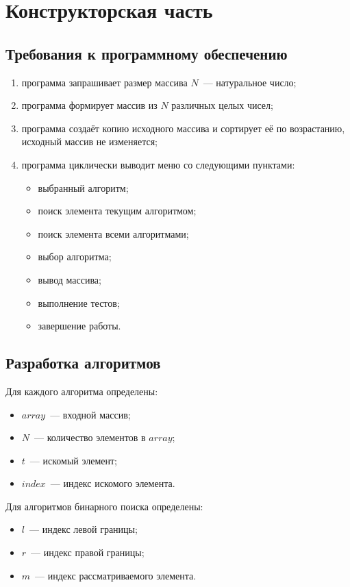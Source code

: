 \chapter{Конструкторская часть}

\section{Требования к программному обеспечению}

\begin{enumerate}
  \item программа запрашивает размер массива $N$~--- натуральное число;
  \item программа формирует массив из $N$ различных целых чисел;
  \item программа создаёт копию исходного массива и сортирует её
    по возрастанию, исходный массив не изменяется;
  \item программа циклически выводит меню со следующими пунктами:
    \begin{itemize}
      \item выбранный алгоритм;
      \item поиск элемента текущим алгоритмом;
      \item поиск элемента всеми алгоритмами;
      \item выбор алгоритма;
      \item вывод массива;
      \item выполнение тестов;
      \item завершение работы.
    \end{itemize}
\end{enumerate}

\section{Разработка алгоритмов}
Для каждого алгоритма определены:
\begin{itemize}
	\item $array$~--- входной массив;
	\item $N$~--- количество элементов в $array$;
	\item $t$~--- искомый элемент;
	\item $index$~--- индекс искомого элемента.
\end{itemize}

Для алгоритмов бинарного поиска определены:
\begin{itemize}
	\item $l$~--- индекс левой границы;
	\item $r$~--- индекс правой границы;
	\item $m$~--- индекс рассматриваемого элемента.
\end{itemize}

